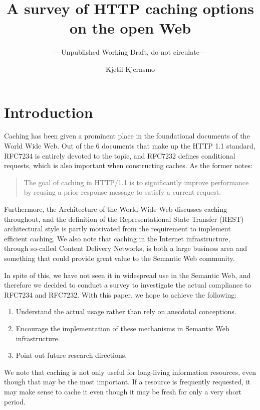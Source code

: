 \documentclass{llncs}
\title{A survey of HTTP caching options on the open Web}
\author{Kjetil Kjernsmo\inst{1}}
\institute{Department of Informatics,
Postboks 1080 Blindern,
N-0316 Oslo, Norway \email{kjetil@kjernsmo.net}}
\subtitle{---Unpublished Working Draft, do not circulate---}
\begin{document}
\maketitle

\begin{abstract}
\end{abstract}

\section{Introduction}

Caching has been given a prominent place in the foundational documents
of the World Wide Web. Out of the 6 documents that make up the HTTP
1.1 standard, RFC7234 \cite{rfc7234} is entirely devoted to the topic,
and RFC7232 \cite{rfc7232} defines conditional requests, which is also
important when constructing caches. As the former notes:
\begin{quote} 
  The goal of caching in HTTP/1.1 is to significantly improve
  performance by reusing a prior response message to satisfy a current
  request.
\end{quote}
Furthermore, the Architecture of the World Wide Web
\cite{Jacobs:04:AWW} discusses caching throughout, and the definition
of the Representational State Transfer (REST) architectural style
\cite{Fielding_2000_Architectural-Styles} is partly motivated from the
requirement to implement efficient caching. We also note that caching
in the Internet infrastructure, through so-called Content Delivery
Networks, is both a large business area and something that could
provide great value to the Semantic Web community.

In spite of this, we have not seen it in widespread use in the
Semantic Web, and therefore we decided to conduct a survey to
investigate the actual compliance to RFC7234 and RFC7232. 
With this paper, we hope to achieve the following:
\begin{enumerate}
\item Understand the actual usage rather than rely on anecdotal
  conceptions.
\item Encourage the implementation of these mechanisms in Semantic Web
  infrastructure.
\item Point out future research directions.
\end{enumerate}

We note that caching is not only useful for long-living information
resources, even though that may be the most important. If a resource
is frequently requested, it may make sense to cache it even though it
may be fresh for only a very short period.
\end{document}
